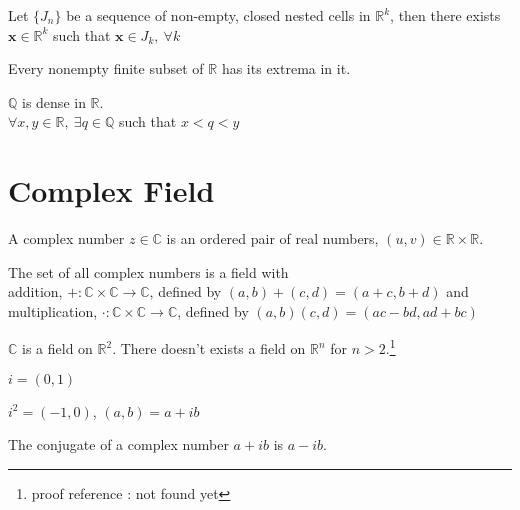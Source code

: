 	\begin{theorem}
		Let $\{ J_n \}$ be a sequence of non-empty, closed nested cells in $\mathbb{R}^k$, then there exists $\textbf{x} \in \mathbb{R}^k$ such that $\textbf{x} \in J_k,\ \forall k$
	\end{theorem}

	\begin{theorem}
		Every nonempty finite subset of $\mathbb{R}$ has its extrema in it.
	\end{theorem}

	\begin{theorem}
		$\mathbb{Q}$ is dense in $\mathbb{R}$.\\ 
		$\forall x,y \in \mathbb{R},\ \exists q \in \mathbb{Q}$ such that $x < q < y$
	\end{theorem}

\section{Complex Field}
	\begin{definition}
		A complex number $z \in \mathbb{C}$ is an ordered pair of real numbers, $(u,v) \in \mathbb{R} \times \mathbb{R}$.
	\end{definition}

	\begin{theorem}
		The set of all complex numbers is a field with\\
		addition, $+ : \mathbb{C} \times \mathbb{C} \to \mathbb{C}$, defined by $(a,b)+(c,d) = (a+c,b+d)$ and\\
		multiplication, $\cdot : \mathbb{C} \times \mathbb{C} \to \mathbb{C}$, defined by $(a,b)(c,d) = (ac-bd,ad+bc)$
	\end{theorem}

	\begin{remark}
		$\mathbb{C}$ is a field on $\mathbb{R}^2$.
		There doesn't exists a field on $\mathbb{R}^n$ for $n>2$.\footnote{proof reference : not found yet}
	\end{remark}

	\begin{definition}
		$i = (0,1)$
	\end{definition}

	\begin{theorem}
		$i^2 = (-1,0)$, $(a,b) = a + ib$
	\end{theorem}

	\begin{definition}
		The conjugate of a complex number $a+ib$ is $a-ib$.
	\end{definition}

